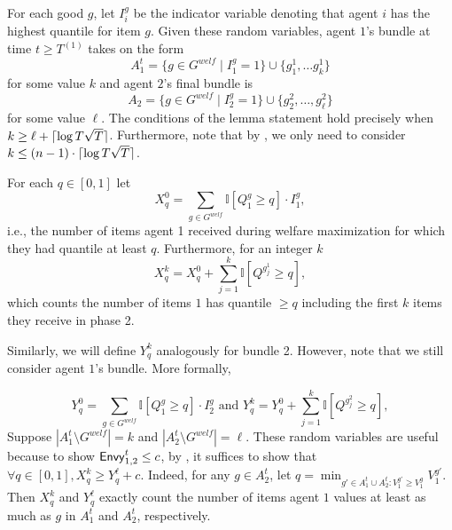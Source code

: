         For each good $g$, let $I^g_i$ be the indicator variable denoting that agent $i$ has the highest quantile for item $g$. Given these random variables, agent $1$'s bundle at time $t \ge T^{(1)}$ takes on the form $$A^t_1 = \{g \in G^{welf} \mid I^g_1 = 1\} \cup \{g^1_1, \ldots g^1_k\}$$ for some value $k$ and agent $2$'s final bundle is $$A_2 = \{g \in G^{welf} \mid I^g_2 = 1\} \cup \{g^2_2, \ldots, g^2_\ell\}$$ for some value $\ell$. The conditions of the lemma statement hold precisely when $k \ge \ell + \lceil\log T \sqrt{T}\rceil$. Furthermore, note that by , we only need to consider $k \le (n - 1) \cdot \lceil\log T \sqrt{T}\rceil$. 

        For each $q \in [0, 1]$ let \[X^0_q = \sum_{g \in G^{welf}} \mathbb{I}[Q^g_1 \ge q] \cdot I^g_1,\]
        i.e., the number of items agent 1 received during welfare maximization for which they had quantile at least $q$. Furthermore, for an integer $k$
        \[
            X^k_q = X^0_q + \sum_{j = 1}^k \mathbb{I}[Q^{g^1_j} \ge q],
        \]
        which counts the number of items $1$ has quantile $\ge q$ including the first $k$ items they receive in phase 2.

        Similarly, we will define $Y^k_q$ analogously for bundle 2. However, note that we still consider agent $1$'s bundle. More formally,

        \[
            Y^0_q = \sum_{g \in G^{welf}} \mathbb{I}[Q^g_1 \ge q] \cdot I^g_2 \text{ and } Y^k_q = Y^0_q + \sum_{j = 1}^k \mathbb{I}[Q^{g^2_j} \ge q],
        \]
Suppose $|A^t_1 \setminus G^{welf}| = k$ and $|A^t_2 \setminus G^{welf}| = \ell$. These random variables are useful because to show $\mathsf{Envy}^t_{1, 2} \le c$, by , it suffices to show that $\forall q \in [0, 1], X^k_q \ge Y^\ell_q + c$. Indeed, for any $g \in A^t_2$, let $q = \min_{g' \in A^t_1 \cup A^t_2: V^{g'}_1 \ge V^g_1} V^{g'}_1$. Then $X^k_q$ and $Y^\ell_q$ exactly count the number of items agent $1$ values at least as much as $g$ in $A^t_1$ and $A^t_2$, respectively.

